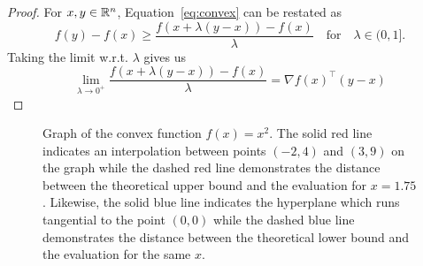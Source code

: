 \begin{proof}
    For $x, y \in \mathbb R^n$, Equation~\ref{eq:convex} can be restated as
    \begin{equation}
        f(y) - f(x) \geq \frac{f(x + \lambda(y - x)) - f(x)}{\lambda} \quad
        \text{for} \quad \lambda \in (0, 1].
    \end{equation}
    Taking the limit w.r.t. $\lambda$ gives us
    \begin{equation}
        \lim_{\lambda \rightarrow 0^+} \frac{f(x + \lambda(y - x)) -
        f(x)}{\lambda} = \nabla {f(x)}^\intercal(y - x)
    \end{equation}
\end{proof}

\begin{figure}[t]
    \begin{center}
    \end{center}
    \caption{Graph of the convex function $f(x) = x^2$. The solid red line
    indicates an interpolation between points $(-2, 4)$ and $(3, 9)$ on the
    graph while the dashed red line demonstrates the distance between the
    theoretical upper bound and the evaluation for $x = 1.75$. Likewise, the
    solid blue line indicates the hyperplane which runs tangential to the point
    $(0, 0)$ while the dashed blue line demonstrates the distance between the
    theoretical lower bound and the evaluation for the same $x$.}%
    \label{fig:convex}
\end{figure}

